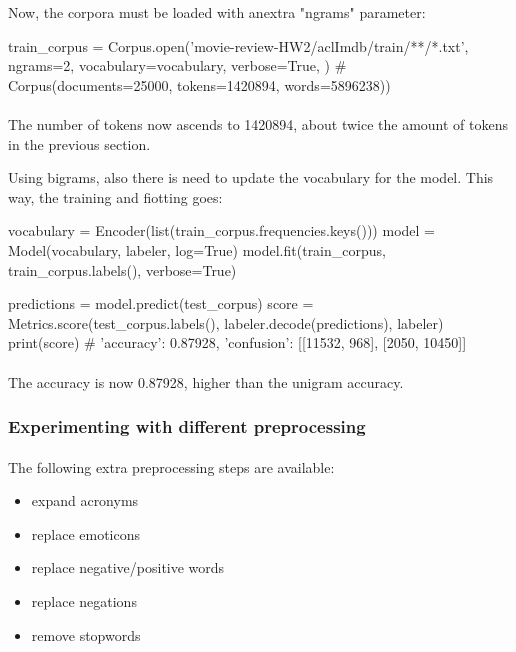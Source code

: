 \documentclass{article}
\begin{document}
Now, the corpora must be loaded with anextra "ngrams" parameter:

\begin{python}
train_corpus = Corpus.open('movie-review-HW2/aclImdb/train/**/*.txt',
    ngrams=2,
    vocabulary=vocabulary,
    verbose=True,
)
# Corpus(documents=25000, tokens=1420894, words=5896238))
\end{python}

\paragraph{} The number of tokens now ascends to 1420894, about twice the amount of tokens in the previous section.

Using bigrams, also there is need to update the vocabulary for the model. This way, the training and fiotting goes:

\begin{python}
vocabulary = Encoder(list(train_corpus.frequencies.keys()))
model = Model(vocabulary, labeler, log=True)
model.fit(train_corpus, train_corpus.labels(), verbose=True)

predictions = model.predict(test_corpus)
score = Metrics.score(test_corpus.labels(), labeler.decode(predictions), labeler)
print(score)
# {'accuracy': 0.87928, 'confusion': [[11532, 968], [2050, 10450]]}
\end{python}

\paragraph{} The accuracy is now 0.87928, higher than the unigram accuracy.

\subsubsection*{Experimenting with different preprocessing}

\paragraph{} The following extra preprocessing steps are available:

\begin{itemize}
\item expand acronyms
\item replace emoticons
\item replace negative/positive words
\item replace negations
\item remove stopwords
\end{itemize}
\end{document}
